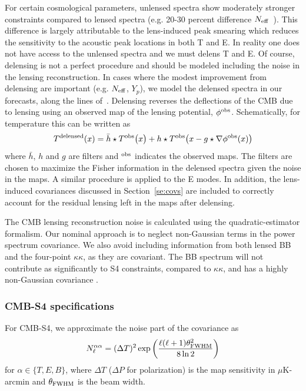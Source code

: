 For certain cosmological parameters, unlensed spectra show moderately stronger constraints compared to lensed spectra (e.g. 20-30 percent difference $N_{\rm eff}$~\cite{Baumann:2015rya}).  This difference is largely attributable to the lens-induced peak smearing which reduces the sensitivity to the acoustic peak locations in both T and E.  In reality one does not have access to the unlensed spectra and we must delens T and E.  Of course, delensing is not a perfect procedure and should be modeled including the noise in the lensing reconstruction.  In cases where the modest improvement from delensing are important (e.g. $N_\mathrm{eff}$, $Y_p$), we model the delensed spectra in our forecasts, along the lines of~\cite{Green:app}.  Delensing reverses the deflections of the CMB due to lensing using an observed map of the lensing potential, $\phi^{\rm obs}$.  Schematically, for temperature this can be written as
\begin{equation}
T^{\rm delensed}(x) = \bar h \star T^{\rm obs}\big(x \big) + h \star T^{\rm obs}\big(x-g\star \nabla \phi^{\rm obs}(x)\big)
\end{equation}
where $\bar h$, $h$ and $g$ are filters and $^{\rm obs}$ indicates the observed maps.  The filters are chosen to maximize the Fisher information in the delensed spectra given the noise in the maps.  A similar procedure is applied to the E modes.  In addition, the lens-induced covariances discussed in Section~\ref{se:covs} are included to correctly account for the residual lensing left in the maps after delensing.

The CMB lensing reconstruction noise is calculated using the \cite{Hu:2001kj} quadratic-estimator formalism. Our nominal approach is to neglect non-Gaussian terms in the power spectrum covariance. We also avoid including information from both lensed BB and the four-point $\kappa \kappa$, as they are covariant. The BB spectrum will not contribute as significantly to S4 constraints, compared to $\kappa \kappa$, and has a highly non-Gaussian covariance \cite{BenoitLevy:2012va}. 

\subsubsection{CMB-S4 specifications}
For CMB-S4, we approximate the noise part of the covariance as
%
\begin{equation}
N^{\alpha \alpha}_\ell = (\Delta T)^2 \exp \left( \frac{\ell(\ell + 1) \theta^2_{\rm FWHM}}{8 \ln 2} \right)
\end{equation}
%
for $\alpha \in \{T, E, B\}$, where $\Delta T$ ($\Delta P$ for polarization) is the map sensitivity in $\mu$K-arcmin and $\theta_{\rm FWHM}$ is the beam width. 

